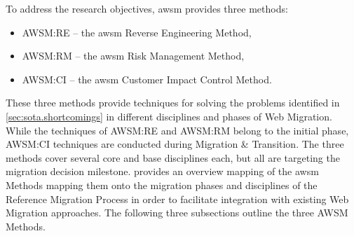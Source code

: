 To address the research objectives, \gls{awsm} provides three methods:
\begin{itemize}
\item AWSM:RE -- the \gls{awsm} Reverse Engineering Method,
\item AWSM:RM -- the \gls{awsm} Risk Management Method,
\item AWSM:CI -- the \gls{awsm} Customer Impact Control Method.
\end{itemize}

These three methods provide techniques for solving the problems identified in \cref{sec:sota.shortcomings} in different  disciplines and phases of \gls{Web Migration}.
While the techniques of AWSM:RE and AWSM:RM belong to the initial phase, AWSM:CI techniques are conducted during Migration \& Transition.
The three methods cover several core and base disciplines each, but all are targeting the migration decision milestone.
 provides an overview mapping of the \gls{awsm} Methods mapping them onto the migration phases and disciplines of the Reference Migration Process \autocite{Sneed2010ReMiP} in order to facilitate integration with existing \gls{Web Migration} approaches. %
The following three subsections outline the three AWSM Methods.


